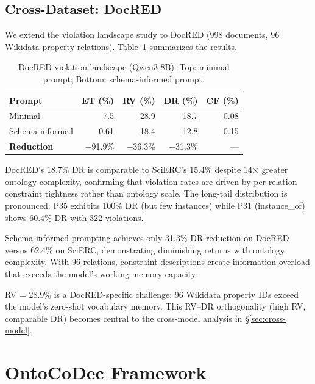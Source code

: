 \documentclass[11pt,a4paper]{article}
\newcommand{\sys}{OntoCoDec}
\begin{document}
\subsection{Cross-Dataset: DocRED}
\label{sec:docred-violations}

We extend the violation landscape study to DocRED (998 documents, 96 Wikidata property relations). Table~\ref{tab:docred-landscape} summarizes the results.

\begin{table}[t]
\centering
\small
\caption{DocRED violation landscape (Qwen3-8B). Top: minimal prompt; Bottom: schema-informed prompt.}
\label{tab:docred-landscape}
\begin{tabular}{lrrrr}
\toprule
\textbf{Prompt} & \textbf{ET (\%)} & \textbf{RV (\%)} & \textbf{DR (\%)} & \textbf{CF (\%)} \\
\midrule
Minimal & 7.5 & 28.9 & 18.7 & 0.08 \\
Schema-informed & 0.61 & 18.4 & 12.8 & 0.15 \\
\midrule
\textbf{Reduction} & $-$91.9\% & $-$36.3\% & $-$31.3\% & --- \\
\bottomrule
\end{tabular}
\end{table}

DocRED's 18.7\% DR is comparable to SciERC's 15.4\% despite 14$\times$ greater ontology complexity, confirming that violation rates are driven by per-relation constraint tightness rather than ontology scale. The long-tail distribution is pronounced: P35 exhibits 100\% DR (but few instances) while P31 (instance\_of) shows 60.4\% DR with 322 violations.

Schema-informed prompting achieves only 31.3\% DR reduction on DocRED versus 62.4\% on SciERC, demonstrating diminishing returns with ontology complexity. With 96 relations, constraint descriptions create information overload that exceeds the model's working memory capacity.

RV = 28.9\% is a DocRED-specific challenge: 96 Wikidata property IDs exceed the model's zero-shot vocabulary memory. This RV--DR orthogonality (high RV, comparable DR) becomes central to the cross-model analysis in \S\ref{sec:cross-model}.

\section{\sys{} Framework}
\label{sec:method}
\end{document}
